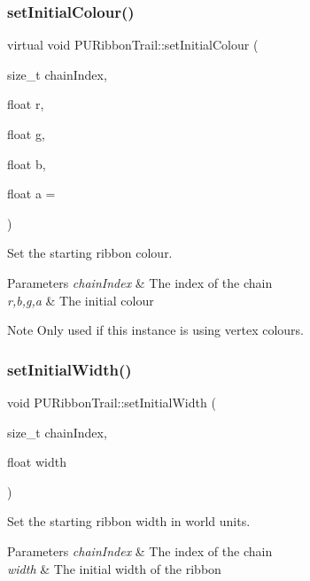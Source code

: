\subsubsection{\texorpdfstring{set\+Initial\+Colour()}{setInitialColour()}\hspace{0.1cm}{\footnotesize\ttfamily [4/4]}}
{\footnotesize\ttfamily virtual void P\+U\+Ribbon\+Trail\+::set\+Initial\+Colour (\begin{DoxyParamCaption}\item[{size\+\_\+t}]{chain\+Index,  }\item[{float}]{r,  }\item[{float}]{g,  }\item[{float}]{b,  }\item[{float}]{a = {} }\end{DoxyParamCaption})\hspace{0.3cm}{\ttfamily [virtual]}}

Set the starting ribbon colour. 
\begin{DoxyParams}{Parameters}
{\em chain\+Index} & The index of the chain \\
\hline
{\em r,b,g,a} & The initial colour \\
\hline
\end{DoxyParams}
\begin{DoxyNote}{Note}
Only used if this instance is using vertex colours. 
\end{DoxyNote}
\mbox{\label{classPURibbonTrail_a15332ae9a9cd320b5dfa5537777ce77b}} 
\subsubsection{\texorpdfstring{set\+Initial\+Width()}{setInitialWidth()}\hspace{0.1cm}{\footnotesize\ttfamily [1/2]}}
{\footnotesize\ttfamily void P\+U\+Ribbon\+Trail\+::set\+Initial\+Width (\begin{DoxyParamCaption}\item[{size\+\_\+t}]{chain\+Index,  }\item[{float}]{width }\end{DoxyParamCaption})\hspace{0.3cm}{\ttfamily [virtual]}}

Set the starting ribbon width in world units. 
\begin{DoxyParams}{Parameters}
{\em chain\+Index} & The index of the chain \\
\hline
{\em width} & The initial width of the ribbon \\
\hline
\end{DoxyParams}
\mbox{\label{classPURibbonTrail_abae89c4ad509b7c21d2020e7327ee32c}} 
